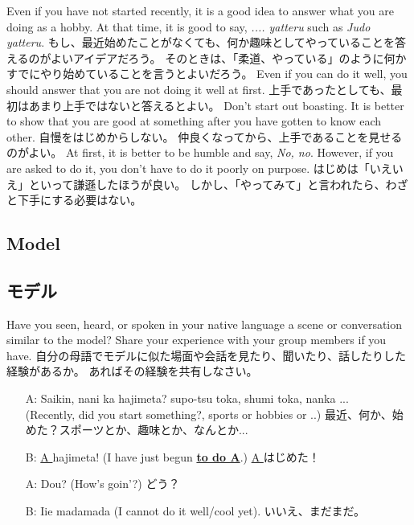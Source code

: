 \documentclass[uplatex,dvipdfmx,b5paper,english,10pt]{jsbook}
\begin{document}
\ifEnglish
Even if you have not started recently, it is a good idea to answer what you are doing as a hobby.
At that time, it is good to say, {\it .... yatteru\/} such as {\it Judo yatteru\/}.
\else
もし、最近始めたことがなくても、何か趣味としてやっていることを答えるのがよいアイデアだろう。
そのときは、「柔道、やっている」のように何かすでにやり始めていることを言うとよいだろう。
\fi
\ifEnglish
Even if you can do it well, you should answer that you are not doing it well at first.
\else
上手であったとしても、最初はあまり上手ではないと答えるとよい。
\fi
\ifEnglish
Don't start out boasting.
It is better to show that you are good at something after you have gotten to know each other.
\else
自慢をはじめからしない。
仲良くなってから、上手であることを見せるのがよい。
\fi
\ifEnglish
At first, it is better to be humble and say, {\it No, no\/}.
However, if you are asked to do it, you don't have to do it poorly on purpose.
\else
はじめは「いえいえ」といって謙遜したほうが良い。
しかし、「やってみて」と言われたら、わざと下手にする必要はない。
\fi

\ifEnglish
\subsection{Model}
\else
\subsection{モデル}
\fi

\begin{toiquestion}
\ifEnglish
Have you seen, heard, or spoken in your native language a scene or conversation similar to the model?
Share your experience with your group members if you have.
\else
自分の母語でモデルに似た場面や会話を見たり、聞いたり、話したりした経験があるか。
あればその経験を共有しなさい。
\fi
\end{toiquestion}

\begin{itemize}
 \item[A:]
   \ifEnglish
  Saikin, nani ka hajimeta?
  supo-tsu toka, shumi toka, nanka ... \\
  (Recently, did you start something?, sports or hobbies or ..)
   \else
   最近、何か、始めた？スポーツとか、趣味とか、なんとか...
   \fi
 \item[B:]
   \ifEnglish
   \underline{ A } hajimeta! (I have just begun \underline{{\bfseries to do A}}.)
   \else
   \underline{ A } はじめた！
   \fi
 \item[A:]
   \ifEnglish
   Dou? (How's goin'?)
   \else
   どう？
   \fi
 \item[B:]
   \ifEnglish
   Iie madamada (I cannot do it well/cool yet).
   \else
   いいえ、まだまだ。
   \fi
\end{itemize}
\end{document}
